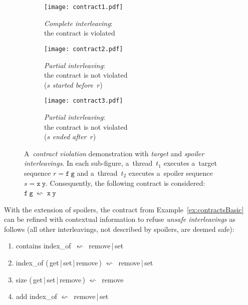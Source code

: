 \begin{figure}[hbt]
    \centering

    \begin{subfigure}[t]{.31 \linewidth}
        \centering
        \texttt{[image: contract1.pdf]}
        \caption{\emph{Complete interleaving}: \\ the contract is violated}
        \label{fig:contract1}
    \end{subfigure}
%
    \hfill
%
    \begin{subfigure}[t]{.31 \linewidth}
        \centering
        \texttt{[image: contract2.pdf]}
        \caption{\emph{Partial interleaving}: \\ the contract is not violated \\ ($ s $ \emph{started before}~$ r $)}
        \label{fig:contract2}
    \end{subfigure}
%
    \hfill
%
    \begin{subfigure}[t]{.31 \linewidth}
        \centering
        \texttt{[image: contract3.pdf]}
        \caption{\emph{Partial interleaving}: \\ the contract is not violated \\ ($ s $ \emph{ended after}~$ r $)}
        \label{fig:contract3}
    \end{subfigure}

    \caption{A~\emph{contract violation} demonstration with \emph{target} and \emph{spoiler interleavings}. In each sub-figure, a~thread~$ t_1 $ executes a~target sequence $ r = \mathtt{f\ g} $ and a~thread~$ t_2 $ executes a~spoiler sequence $ s = \mathtt{x\ y} $. Consequently, the following contract is considered: $ \mathtt{f\ g}\ \leftsquigarrow\ \mathtt{x\ y} $~\cite{muzikovskaBP}}
\end{figure}

\begin{example}
    With the extension of spoilers, the contract from Example~\ref{ex:contractsBasic} can be refined with contextual information to refuse \emph{unsafe interleavings} as follows (all other interleavings, not described by spoilers, are deemed  safe):
    \begin{enumerate}[label={($ \varrho^{\prime\prime}_{\arabic*} $)}]
        \tt

        \item contains index\_of\ $ \leftsquigarrow $\ remove\,|\,set

        \item index\_of (\,get\,|\,set\,|\,remove\,) $ \leftsquigarrow $\ remove\,|\,set

        \item size (\,get\,|\,set\,|\,remove\,) $ \leftsquigarrow $\ remove

        \item add index\_of $ \leftsquigarrow $\ remove\,|\,set
    \end{enumerate}
\end{example}


